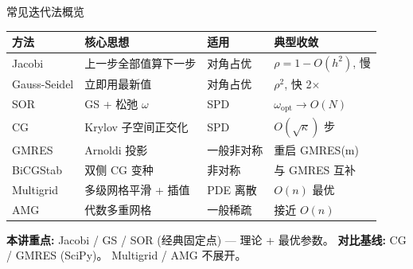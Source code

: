 \documentclass[12pt,aspectratio=169]{beamer}
\begin{document}
\begin{frame}[shrink]{常见迭代法概览}

\footnotesize
\begin{center}
\renewcommand{\arraystretch}{1.1}
\setlength{\tabcolsep}{4pt}
\begin{tabular}{@{}l p{3.6cm} l p{3.8cm}@{}}
\toprule
\textbf{方法} & \textbf{核心思想} & \textbf{适用} & \textbf{典型收敛} \\
\midrule
Jacobi       & 上一步全部值算下一步   & 对角占优       & $\rho = 1 - O(h^2)$, 慢 \\
Gauss-Seidel & 立即用最新值           & 对角占优       & $\rho^2$, 快 2$\times$ \\
SOR          & GS + 松弛 $\omega$     & SPD            & $\omega_{\text{opt}} \to O(N)$ \\
\midrule
CG           & Krylov 子空间正交化    & SPD            & $O(\sqrt{\kappa})$ 步 \\
GMRES        & Arnoldi 投影           & 一般非对称     & 重启 GMRES(m) \\
BiCGStab     & 双侧 CG 变种           & 非对称         & 与 GMRES 互补 \\
\midrule
Multigrid    & 多级网格平滑 + 插值    & PDE 离散       & $O(n)$ 最优 \\
AMG          & 代数多重网格           & 一般稀疏       & 接近 $O(n)$ \\
\bottomrule
\end{tabular}
\end{center}
\normalsize

\vspace{4pt}
\small \textbf{本讲重点:} Jacobi / GS / SOR (经典固定点) — 理论 + 最优参数。 \textbf{对比基线:} CG / GMRES (SciPy)。 Multigrid / AMG 不展开。
\end{frame}
\end{document}
